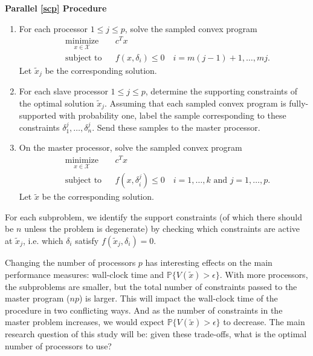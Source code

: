 \documentclass[12pt]{article}
\begin{document}
\textbf{Parallel \ref{scp} Procedure}
\begin{enumerate}
\item For each processor $1 \leq j \leq p$, solve the sampled convex program
\begin{equation*}
\begin{aligned}
    & \underset{x \in \mathcal{X}}{\text{minimize}}
    & & c^T x \\
    & \text{subject to}
    & & f(x,\delta_i) \leq 0 \quad i = m(j-1) + 1, \ldots, mj.
\end{aligned}
\end{equation*}
Let $\tilde{x}_j$ be the corresponding solution.
\item For each slave processor $1 \leq j \leq p$, determine the supporting constraints of the 
optimal solution $\tilde{x}_j$.
Assuming that each sampled convex program is fully-supported with probability one,
label the sample corresponding to these constraints $\delta_1^j, \ldots, \delta_n^j$.
Send these samples to the master processor.
\item On the master processor, solve the sampled convex program
\begin{equation*}
\begin{aligned}
    & \underset{x \in \mathcal{X}}{\text{minimize}}
    & & c^T x \\
    & \text{subject to}
    & & f(x,\delta_i^j) \leq 0 \quad i = 1,\ldots,k \text{ and } j = 1,\ldots,p.
\end{aligned}
\end{equation*}
Let $\tilde{x}$ be the corresponding solution.
\end{enumerate}

For each subproblem, we identify the support constraints (of which there should be $n$ unless the problem is degenerate) by checking which constraints are active at $\tilde{x}_j$, i.e. which $\delta_i$ satisfy $f(\tilde{x}_j, \delta_i) = 0$.

Changing the number of processors $p$ has interesting effects on the main performance measures: wall-clock time and $\mathbb{P}\{V(\tilde{x}) > \epsilon\}$.
With more processors, the subproblems are smaller, but the total number of constraints passed to the master program ($np$) is larger.
This will impact the wall-clock time of the procedure in two conflicting ways.
And as the number of constraints in the master problem increases, we would expect $\mathbb{P}\{V(\tilde{x}) > \epsilon\}$ to decrease.
The main research question of this study will be: given these trade-offs, what is the optimal number of processors to use?
\end{document}
